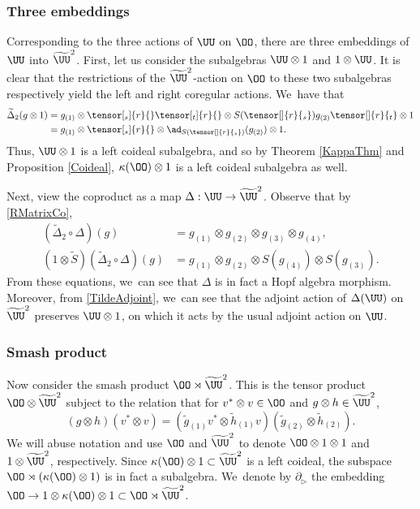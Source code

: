 \subsubsection{Three embeddings}
Corresponding to the three actions of $\UU$ on $\OO$, there are three embeddings of $\UU$ into $\widetilde{\UU}^2$.
First, let us consider the subalgebras $\UU\otimes 1$ and $1\otimes\UU$.
It is clear that the restrictions of the $\widetilde{\UU}^2$-action on $\OO$ to these two subalgebras respectively yield the left and right coregular actions. We~have that\vspace*{-3pt}
\begin{equation}
\begin{aligned}
\widetilde{\Delta}_2(g\otimes 1)&=g_{(1)}\otimes \tensor[_s]{r}{}\tensor[_t]{r}{}\otimes S(\tensor[]{r}{_s})g_{(2)}\tensor[]{r}{_t}\otimes 1\\
&= g_{(1)}\otimes \tensor[_s]{r}{}\otimes \ad_{S(\tensor[]{r}{_s})} (g_{(2)})\otimes 1.
\end{aligned}
\label{SubCoproductL}
\end{equation}
Thus, $\UU\otimes 1$ is a left coideal subalgebra, and so by Theorem \ref{KappaThm} and Proposition \ref{Coideal}, $\kappa(\OO)\otimes 1$ is a left coideal subalgebra as well.

Next, view the coproduct as a map $\Delta:\UU\to\widetilde{\UU}^2$.
Observe that by \eqref{RMatrixCo},\vspace*{-3pt}
\begin{align}
\nonumber
(\widetilde{\Delta}_2\circ\Delta)(g)&=g_{(1)}\otimes g_{(2)}\otimes g_{(3)}\otimes g_{(4)},\\
\label{TildeAdjoint}
(1\otimes\widetilde{S})(\widetilde{\Delta}_2\circ\Delta)(g)&=g_{(1)}\otimes g_{(2)}\otimes S(g_{(4)})\otimes S(g_{(3)}).
\end{align}
From these equations, we~can see that $\Delta$ is in fact a Hopf algebra morphism.
Moreover, from \eqref{TildeAdjoint}, we~can see that the adjoint action of $\Delta(\UU)$ on $\widetilde{\UU}^2$ preserves $\UU\otimes 1$, on which it acts by the usual adjoint action on $\UU$.

\subsubsection{Smash product}
Now consider the smash product $\OO\rtimes\widetilde{\UU}^2$.
This is the tensor product $\OO\otimes\widetilde{\UU}^2$ subject to the relation that for $v^*\otimes v\in\OO$ and $g\otimes h\in\widetilde{\UU}^2$,\vspace*{-3pt}
\begin{equation}
(g\otimes h)(v^*\otimes v)=(\tilde{g}_{(1)}v^*\otimes\tilde{h}_{(1)}v)(\tilde{g}_{(2)}\otimes\tilde{h}_{(2)}).
\label{SmashProdDef}
\end{equation}
We will abuse notation and use $\OO$ and $\widetilde{\UU}^2$ to denote $\OO\otimes 1\otimes 1$ and $1\otimes \widetilde{\UU}^2$, respectively.
Since $\kappa(\OO)\otimes 1\subset\widetilde{\UU}^2$ is a left coideal, the subspace $\OO\rtimes(\kappa(\OO)\otimes 1)$ is in fact a subalgebra. We~denote by $\partial_\triangleright$ the embedding $\OO\to1\otimes\kappa(\OO)\otimes 1\subset\OO\rtimes\widetilde{\UU}^2$.

